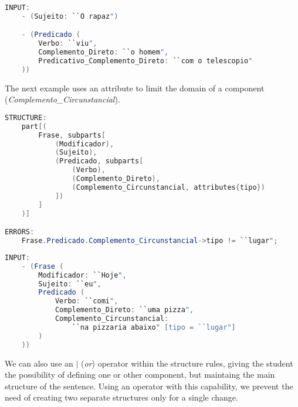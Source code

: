\begin{center}
\begin{minipage}{14cm}
\begin{lstlisting}[language=java, basicstyle=\small, label={lst:example_input1}, caption=Example of a sentence input]
INPUT:
    - (Sujeito: ``O rapaz")

    - (Predicado (
        Verbo: ``viu",
        Complemento_Direto: ``o homem",
        Predicativo_Complemento_Direto: ``com o telescopio"
    ))
\end{lstlisting}
\end{minipage}
\end{center}


The next example uses an attribute to limit the domain of a component (\textit{Complemento\_Circunstancial}).

\begin{center}
\begin{minipage}{15cm}
\begin{lstlisting}[language=java, basicstyle=\small, label={lst:example_structure3}, caption=Example of a sentence structure]
STRUCTURE:
    part[(
        Frase, subparts[
            (Modificador),
            (Sujeito),
            (Predicado, subparts[
                (Verbo),
                (Complemento_Direto),
                (Complemento_Circunstancial, attributes{tipo})
            ])
        ]
    )]

ERRORS:
    Frase.Predicado.Complemento_Circunstancial->tipo != ``lugar";
\end{lstlisting}
\end{minipage}
\end{center}

\begin{center}
\begin{minipage}{15cm}
\begin{lstlisting}[language=java, basicstyle=\small, label={lst:example_input3}, caption=Example of a sentence input]
INPUT:
    - (Frase (
        Modificador: ``Hoje",
        Sujeito: ``eu",
        Predicado (
            Verbo: ``comi",
            Complemento_Direto: ``uma pizza",
            Complemento_Circunstancial: 
                ``na pizzaria abaixo" [tipo = ``lugar"]
        )
    ))
\end{lstlisting}
\end{minipage}
\end{center}


We can also use an \textbf{\(|\)} (\textit{or}) operator within the structure rules, giving the student the possibility of defining one or other component,
but maintaing the main structure of the sentence. 
Using an operator with this capability, we prevent the need of creating two separate structures only for a single change. 

